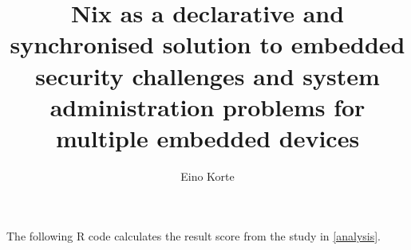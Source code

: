 \documentclass[language=english,version=final,mainfont=none,sharelatex=false]{utuftthesis}
\providecommand{\algorithmname}{Algoritmi}
\begin{document}
\title{Nix as a declarative and synchronised solution to embedded security challenges and system administration problems for multiple embedded devices}
\author{Eino Korte}

\maketitle


\tableofcontents

\listoffigures

\listoftables

\listofacronyms

\renewcommand{\algorithmname}{\listingscaption}


\begin{comment}
To better organize things, create a new tex file for each chapter
and input it below.

Avoid using the å, ä, ö or <space> characters in referred names and
underscores \_ in file names (may break hyperref).

Good luck!
\end{comment}

    

%
%


\printbibliography

\begin{comment}
Important! Create the appendix chapters with command \textbackslash appchapter\{some
name\} instead of \textbackslash chapter\{some name\} for the automagic
page counting to work!
\end{comment}



The following R code calculates the result score from the study in \ref{analysis}.
\end{document}
